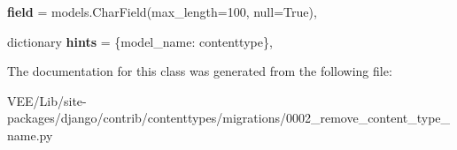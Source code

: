 \begin{DoxyCompactItemize}
{\bfseries field} = models.\+Char\+Field(max\+\_\+length=100, null=True),
\item 
\mbox{\label{classdjango_1_1contrib_1_1contenttypes_1_1migrations_1_10002__remove__content__type__name_1_1_migration_a8f62ff912828f70815d7a366395de9c9}} 
dictionary {\bfseries hints} = \{\textquotesingle{}model\+\_\+name\textquotesingle{}\+: \textquotesingle{}contenttype\textquotesingle{}\},
\end{DoxyCompactItemize}


The documentation for this class was generated from the following file\+:\begin{DoxyCompactItemize}
\item 
V\+E\+E/\+Lib/site-\/packages/django/contrib/contenttypes/migrations/0002\+\_\+remove\+\_\+content\+\_\+type\+\_\+name.\+py\end{DoxyCompactItemize}
